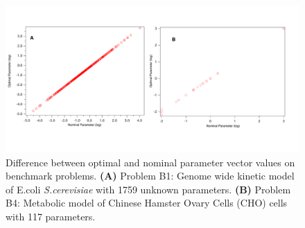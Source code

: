 \documentclass[12pt]{article}
\begin{document}
\begin{figure}[H]
\centering
\includegraphics[width=1.02\textwidth,height=0.5\textheight]{./figs/Figure_7_Benchmarks_Parameters}
\caption{Difference between optimal and nominal parameter vector values on benchmark problems. \textbf {(A)} Problem B1: Genome wide kinetic model of E.coli \textit{S.cerevisiae} with 1759 unknown parameters. \textbf {(B)} Problem B4: Metabolic model of Chinese  Hamster Ovary Cells (CHO) cells with 117 parameters.
}\label{fig-benchmark}
\end{figure}


\setcounter{equation}{0}
\setcounter{table}{0}
\setcounter{figure}{0}
\setcounter{page}{1}
\end{document}

